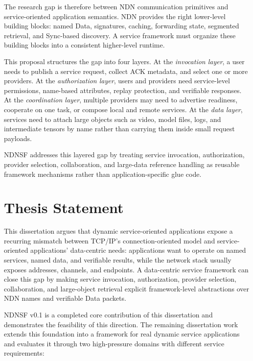 The research gap is therefore between NDN communication primitives and
service-oriented application semantics. NDN provides the right lower-level
building blocks: named Data, signatures, caching, forwarding state, segmented
retrieval, and Sync-based discovery. A service framework must organize these
building blocks into a consistent higher-level runtime.

This proposal structures the gap into four layers. At the \emph{invocation
layer}, a user needs to publish a service request, collect ACK metadata, and
select one or more providers. At the \emph{authorization layer}, users and
providers need service-level permissions, name-based attributes, replay
protection, and verifiable responses. At the \emph{coordination layer}, multiple
providers may need to advertise readiness, cooperate on one task, or compose
local and remote services. At the \emph{data layer}, services need to attach
large objects such as video, model files, logs, and intermediate tensors by
name rather than carrying them inside small request payloads.

NDNSF addresses this layered gap by treating service invocation, authorization,
provider selection, collaboration, and large-data reference handling as reusable
framework mechanisms rather than application-specific glue code.

\section{Thesis Statement}

This dissertation argues that dynamic service-oriented applications expose a
recurring mismatch between TCP/IP's connection-oriented model and
service-oriented applications' data-centric needs: applications want to operate
on named services, named data, and verifiable results, while the network stack
usually exposes addresses, channels, and endpoints. A data-centric service
framework can close this gap by making service invocation, authorization,
provider selection, collaboration, and large-object retrieval explicit
framework-level abstractions over NDN names and verifiable Data packets.

NDNSF v0.1 is a completed core contribution of this dissertation and
demonstrates the feasibility of this direction. The remaining dissertation work
extends this foundation into a framework for real dynamic service applications
and evaluates it through two high-pressure domains with different service
requirements:

